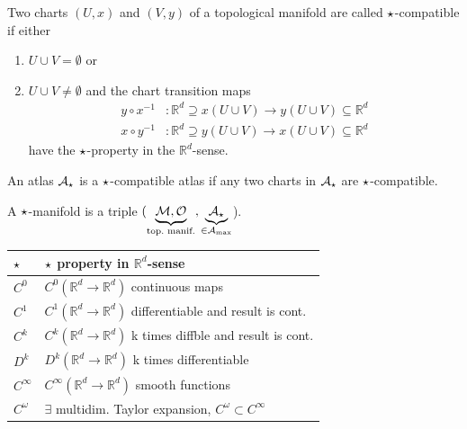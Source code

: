 \documentclass[11pt, a4paper, twocolumn]{article} %
\begin{document}
\begin{defn}
    Two charts $(U, x)$ and $(V, y)$ of a topological manifold are called $\star$-compatible if
    either
    \begin{enumerate}
        \item $U\cup V = \emptyset$ or
        \item $U\cup V \neq \emptyset$ and the chart transition maps
            \begin{align*}
                y\circ x^{-1}&:\mathbb{R}^d\supseteq x(U\cup V) \to y(U\cup V) \subseteq \mathbb{R}^d \\
                x\circ y^{-1}&: \mathbb{R}^d\supseteq y(U\cup V) \to x(U\cup V) \subseteq \mathbb{R}^d
            \end{align*}
            have the $\star$-property in the $\mathbb{R}^d$-sense.
    \end{enumerate}
\end{defn}

\begin{defn}
    An atlas $\mathcal{A}_\star$ is a $\star$-compatible atlas if any two charts in
    $\mathcal{A}_\star$ are $\star$-compatible.
\end{defn}

\begin{defn}
    A $\star$-manifold is a triple $(\underbrace{\M, \mathcal{O}}_{\text{top.\ manif.}}, 
    \underbrace{\mathcal{A}_\flower}_{\in \mathcal{A}_\text{max}}$).
\end{defn}

\begin{footnotesize}
    \begin{centering}
        \begin{tabular}{ll}
            $\star$ & $\star$ property in $\mathbb{R}^d$-sense \\
            \hline\hline
            $C^0$     & $C^0(\mathbb{R}^d \to \mathbb{R}^d)$ continuous maps\\
            $C^1$     & $C^1(\mathbb{R}^d \to \mathbb{R}^d)$ differentiable and result is cont.\\
            $C^k$     & $C^k(\mathbb{R}^d \to \mathbb{R}^d)$ k times diffble and result is cont.\\
            $D^k$     & $D^k(\mathbb{R}^d \to \mathbb{R}^d)$ k times differentiable\\
            $C^\infty$     & $C^\infty(\mathbb{R}^d \to \mathbb{R}^d)$ smooth functions\\
            $C^\omega$  & $\exists$ multidim. Taylor expansion, $C^\omega \subset C^\infty$
        \end{tabular}
    \end{centering}
\end{footnotesize}
\end{document}
